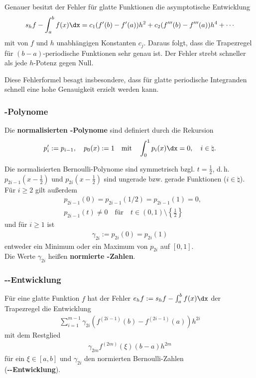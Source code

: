 Genauer besitzt der Fehler für glatte Funktionen die asymptotische Entwicklung
\begin{align*}
    s_h f - \int_a^b f(x)\dx =
    c_1 (f'(b) - f'(a)) h^2 +
    c_2 (f'''(b) - f'''(a)) h^4 + \dotsb
\end{align*}
mit von $f$ und $h$ unabhängigen Konstanten $c_j$.
Daraus folgt, dass die Trapezregel für $(b - a)$-periodische Funktionen
sehr genau ist.
Der Fehler strebt schneller als jede $h$-Potenz gegen Null.

Diese Fehlerformel besagt insbesondere, dass für glatte periodische Integranden
schnell eine hohe Genauigkeit erzielt werden kann.

\subsubsection{%
    -Polynome%
}

Die \textbf{normalisierten -Polynome} sind definiert
durch die Rekursion
\begin{align*}
    p_i' := p_{i-1}, \quad
    p_0(x) := 1 \quad \text{mit} \quad
    \int_0^1 p_i(x)\dx = 0, \quad
    i \in \natural.
\end{align*}

Die normalisierten Bernoulli-Polynome sind symmetrisch bzgl. $t = \frac{1}{2}$,
d.\,h. $p_{2i-1}(x - \frac{1}{2})$ und $p_{2i}(x - \frac{1}{2})$
sind ungerade bzw. gerade Funktionen ($i \in \natural$).
Für $i \ge 2$ gilt außerdem
\begin{align*}
    & p_{2i-1}(0) = p_{2i-1}(1/2) = p_{2i-1}(1) = 0, \\
    & p_{2i-1}(t) \not= 0 \quad\text{für}\quad
    t \in (0, 1) \setminus \left\{\tfrac{1}{2}\right\}
\end{align*}
und für $i \ge 1$ ist
\begin{align*}
    \gamma_{2i} := p_{2i}(0) = p_{2i}(1)
\end{align*}
entweder ein Minimum oder ein Maximum von $p_{2i}$ auf $[0, 1]$. \\
Die Werte $\gamma_{2i}$ heißen \textbf{normierte -Zahlen}.

\pagebreak

\subsubsection{%
    --Entwicklung%
}

Für eine glatte Funktion $f$ hat der Fehler $e_h f := s_h f - \int_a^b f(x)\dx$
der Trapezregel die Entwicklung
\begin{align*}
    \sum_{i=1}^{m-1} \gamma_{2i} (f^{(2i-1)}(b) - f^{(2i-1)}(a)) h^{2i}
\end{align*}
mit dem Restglied
\begin{align*}
    \gamma_{2m} f^{(2m)}(\xi) (b - a) h^{2m}
\end{align*}
für ein $\xi \in [a, b]$ und $\gamma_{2i}$ den normierten Bernoulli-Zahlen \\
(\textbf{--Entwicklung}).

